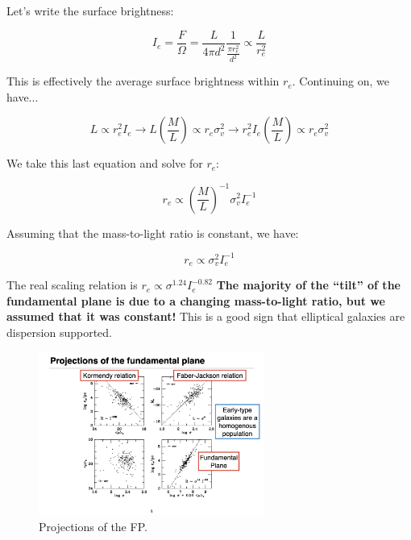 \documentclass{article}
\begin{document}
Let's write the surface brightness:

\begin{equation}
    I_e = \frac{F}{\Omega} = \frac{L}{4\pi d^2} \frac{1}{\frac{\pi r_e^2}{d^2}} \propto \frac{L}{r_e^2}
\end{equation}

This is effectively the average surface brightness within $r_e$. Continuing on, we have...

\begin{equation}
    L \propto r_e^2 I_e \rightarrow L \left(\frac{M}{L}\right) \propto r_e \sigma_v^2 \rightarrow r_e^2 I_e \left(\frac{M}{L}\right) \propto r_e \sigma_v^2
\end{equation}

We take this last equation and solve for $r_e$:

\begin{equation}
    r_e \propto \left(\frac{M}{L} \right)^{-1} \sigma_v^2 I_e^{-1}
\end{equation}

Assuming that the mass-to-light ratio is constant, we have:

\begin{equation}
    r_e \propto \sigma_v^2 I_e^{-1}
\end{equation}

The real scaling relation is $r_e \propto \sigma^{1.24} I_e^{-0.82}$
\textbf{The majority of the ``tilt'' of the fundamental plane is due to a changing mass-to-light ratio, but we assumed that it was constant!} This is a good sign that elliptical galaxies are dispersion supported. 

\begin{figure}
    \centering
    \includegraphics[width=0.66\textwidth]{figs/Screen Shot 2021-10-20 at 10.12.59 AM.png}
    \caption{Projections of the FP.}
    \label{fig:fundamental_plane}
\end{figure}
\end{document}
